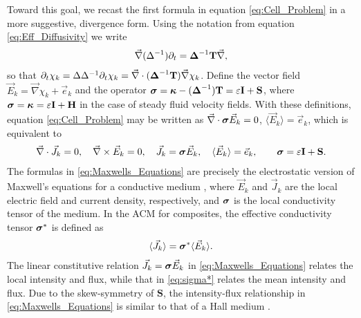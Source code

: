 \documentclass[11pt]{amsart}
\newcommand{\Tb}{\mathbf{T}}
\newcommand{\Hb}{\mathbf{H}}
\newcommand{\Ib}{\mathbf{I}}
\newcommand{\Sb}{\mathbf{S}}
\newcommand\bsig{\mbox{\boldmath${\sigma}$}}
\newcommand\bDelta{\mbox{\boldmath${\Delta}$}}
\newcommand\bkappa{\mbox{\boldmath${\kappa}$}}
\begin{document}
Toward this goal, we recast the first formula in equation
\eqref{eq:Cell_Problem} in a more suggestive, divergence form. Using
the notation from equation \eqref{eq:Eff_Diffusivity} we write 
%
\begin{align}\label{eq:Dt_T}
  \vec{\nabla}(\Delta^{-1})\partial_t=\bDelta^{-1}\Tb\vec{\nabla},
\end{align}
%
so that \cite{Fannjiang:SIAM_JAM:333}
$\partial_t\chi_k=\Delta\Delta^{-1}\partial_t\chi_k=\vec{\nabla}\cdot(\bDelta^{-1}\Tb)\vec{\nabla}\chi_k$. Define the  
vector field $\vec{E}_k=\vec{\nabla}\chi_k+\vec{e}_k$ and the operator
$\bsig=\bkappa-(\bDelta^{-1})\Tb=\varepsilon\Ib+\Sb$, where
$\bsig=\bkappa=\varepsilon\Ib+\Hb$ in the case of steady fluid velocity
fields. With these definitions, equation \eqref{eq:Cell_Problem} may
be written as  $\vec{\nabla}\cdot\bsig\vec{E}_k=0$, $\langle\vec{E}_k\rangle=\vec{e}_k$,
which is equivalent to    
%
\begin{align}\label{eq:Maxwells_Equations}    
  \vec{\nabla}\cdot\vec{J}_k=0, \quad
  \vec{\nabla}\times\vec{E}_k=0, \quad
  \vec{J}_k=\bsig\vec{E}_k,\quad
  \langle\vec{E}_k\rangle=\vec{e}_k,\qquad
  \bsig%
       =\varepsilon\Ib+\Sb.
\end{align}
%
The formulas in \eqref{eq:Maxwells_Equations} are precisely the
electrostatic version of Maxwell's equations for a conductive medium
\cite{Golden:CMP-473}, where $\vec{E}_k$ and $\vec{J}_k$ are the local
electric field and current density, respectively, and $\bsig$ is the
local conductivity tensor of the medium. In the ACM for composites,
the effective conductivity tensor $\bsig^*$ is defined as
% 
\begin{align}\label{eq:sigma*}
  \langle\vec{J}_k\rangle=\bsig^*\langle\vec{E}_k\rangle.
\end{align}
%
The linear constitutive relation $\vec{J}_k=\bsig\vec{E}_k$ in
\eqref{eq:Maxwells_Equations} relates the local intensity and flux,
while that in \eqref{eq:sigma*} relates the mean intensity and
flux. Due to the skew-symmetry of $\Sb$, the intensity-flux
relationship in \eqref{eq:Maxwells_Equations} is similar to that of a
Hall medium \cite{Isichenko:JNS:1991:375}.
\end{document}
